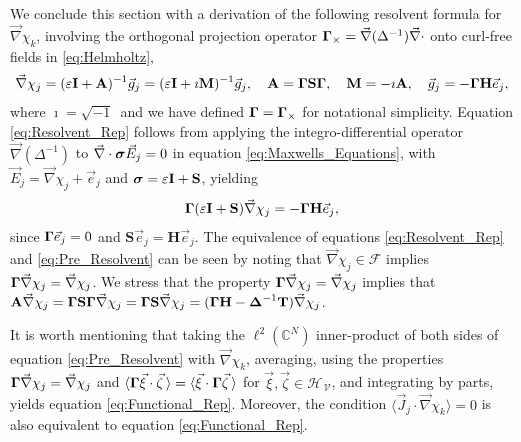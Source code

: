 \documentclass[11pt]{amsart}
\newcommand{\Mb}{\mathbf{M}}
\newcommand{\Tb}{\mathbf{T}}
\newcommand{\Hb}{\mathbf{H}}
\newcommand{\Ib}{\mathbf{I}}
\newcommand{\Sb}{\mathbf{S}}
\newcommand{\Ab}{\mathbf{A}}
\newcommand{\Vc}{\mathcal{V}}
\newcommand{\Hs}{\mathscr{H}}
\newcommand{\Fs}{\mathscr{F}}
\newcommand\bsig{\mbox{\boldmath${\sigma}$}}
\newcommand\bDelta{\mbox{\boldmath${\Delta}$}}
\newcommand\bGamma{\mbox{\boldmath${\Gamma}$}}
\begin{document}
We conclude this section with a derivation of the following resolvent
formula for $\vec{\nabla}\chi_k$, involving the orthogonal projection
operator $\bGamma_\times=\vec{\nabla}(\Delta^{-1})\vec{\nabla}\cdot$ onto curl-free fields in
\eqref{eq:Helmholtz},  
\begin{align}\label{eq:Resolvent_Rep}
  \vec{\nabla}\chi_j=(\varepsilon\Ib+\Ab)^{-1}\vec{g}_j
           =(\varepsilon\Ib+\imath\Mb)^{-1}\vec{g}_j, \quad
  \Ab=\bGamma\Sb\bGamma, \quad
  \Mb=-\imath\Ab, \quad
  \vec{g}_j=-\bGamma\Hb\vec{e}_j,
\end{align}
%
where $\imath=\sqrt{-1}\,$ and we have defined $\bGamma=\bGamma_\times$ for
notational simplicity. Equation \eqref{eq:Resolvent_Rep} follows from
applying the integro-differential operator $\vec{\nabla}(\Delta^{-1})$ to
$\vec{\nabla}\cdot\bsig\vec{E}_j=0$ in equation \eqref{eq:Maxwells_Equations},
with $\vec{E}_j=\vec{\nabla}\chi_j+\vec{e}_j$ and $\bsig=\varepsilon\Ib+\Sb$, yielding  
%
\begin{align}\label{eq:Pre_Resolvent}
  \bGamma(\varepsilon\Ib+\Sb)\vec{\nabla}\chi_j=-\bGamma\Hb\vec{e}_j,
\end{align}
%
since $\bGamma\vec{e}_j=0$ and $\Sb\vec{e}_j=\Hb\vec{e}_j$.
The equivalence of equations \eqref{eq:Resolvent_Rep} and
\eqref{eq:Pre_Resolvent} can be seen by noting that
$\vec{\nabla}\chi_j\in\Fs$ implies $\bGamma\vec{\nabla}\chi_j=\vec{\nabla}\chi_j$. We stress
that the property $\bGamma\vec{\nabla}\chi_j=\vec{\nabla}\chi_j$ implies that
$\Ab\vec{\nabla}\chi_j=\bGamma\Sb\bGamma\vec{\nabla}\chi_j=\bGamma\Sb\vec{\nabla}\chi_j
=(\bGamma\Hb-\bDelta^{-1}\Tb)\vec{\nabla}\chi_j$. 



It is worth mentioning that taking the  $\ell^2(\mathbb{C}^N)$
inner-product of both sides of equation \eqref{eq:Pre_Resolvent} with
$\vec{\nabla}\chi_k$, averaging, using the properties
$\bGamma\vec{\nabla}\chi_j=\vec{\nabla}\chi_j$ and
$\langle\bGamma\vec{\xi}\cdot\vec{\zeta}\,\rangle=\langle\vec{\xi}\cdot\bGamma\vec{\zeta}\,\rangle$ for 
$\vec{\xi},\vec{\zeta}\in\Hs_{\,\Vc}$, and integrating by parts, yields
equation  \eqref{eq:Functional_Rep}. Moreover, the condition
$\langle\vec{J}_j\cdot\vec{\nabla}\chi_k\rangle=0$ is also equivalent to equation
\eqref{eq:Functional_Rep}.   
\end{document}
